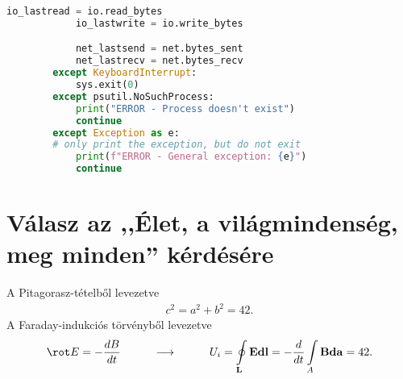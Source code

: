 \begin{lstlisting}[caption={A monitorozáshoz készített, psutil csomagot használó Python-script, mely csv formátumban menti el a metrikákat.},label=lst:python-sysstats,language=Python]
            io_lastread = io.read_bytes
            io_lastwrite = io.write_bytes

            net_lastsend = net.bytes_sent
            net_lastrecv = net.bytes_recv
        except KeyboardInterrupt:
            sys.exit(0)
        except psutil.NoSuchProcess:
            print("ERROR - Process doesn't exist")
            continue
        except Exception as e:
        # only print the exception, but do not exit
            print(f"ERROR - General exception: {e}")
            continue
\end{lstlisting}

\clearpage\section{Válasz az ,,Élet, a világmindenség, meg minden'' kérdésére}
A Pitagorasz-tételből levezetve
\begin{align}
c^2=a^2+b^2=42.
\end{align}
A Faraday-indukciós törvényből levezetve
\begin{align}
\rot E=-\frac{dB}{dt}\hspace{1cm}\longrightarrow \hspace{1cm}
U_i=\oint\limits_\mathbf{L}{\mathbf{E}\mathbf{dl}}=-\frac{d}{dt}\int\limits_A{\mathbf{B}\mathbf{da}}=42.
\end{align}
